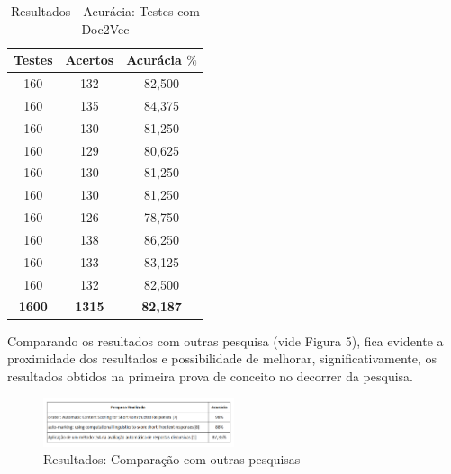\documentclass[conference]{IEEEtran}
\begin{document}
\begin{table}[h]
\caption{Resultados - Acurácia: Testes com Doc2Vec}
\centering
\begin{tabular}{ccc}
\textbf{Testes}                   & \textbf{Acertos}                  & \textbf{Acurácia \(\%\)} \\ \hline
160                                     & 132                                      & 82,500          \\
160                                     & 135                                      & 84,375          \\
160                                     & 130                                      & 81,250          \\
160                                     & 129                                      & 80,625          \\
160                                     & 130                                      & 81,250          \\
160                                     & 130                                      & 81,250          \\
160                                     & 126                                      & 78,750          \\
160                                     & 138                                      & 86,250          \\
160                                     & 133                                      & 83,125          \\
160                                     & 132                                      & 82,500          \\ \hline
\textbf{1600}                     & \textbf{1315}                        & \textbf{82,187}  \\ \hline
\end{tabular}
\end{table}

Comparando os resultados com outras pesquisa (vide Figura 5), fica evidente a proximidade dos resultados e possibilidade de melhorar, significativamente, os resultados obtidos na primeira prova de conceito no decorrer da pesquisa.

\begin{figure}[h]
\centering
\includegraphics[width=0.5\textwidth]{outras_pesquisas}
\caption{Resultados: Comparação com outras pesquisas}
\end{figure}
\end{document}

